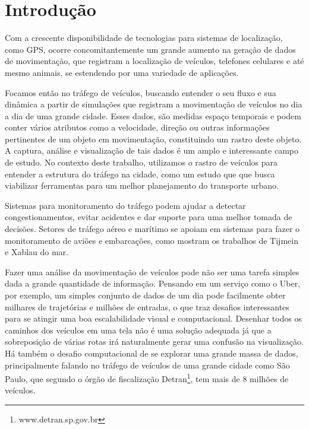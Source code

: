 \chapter{Introdução}
\label{cap:introducao}

Com a crescente disponibilidade de tecnologias para sistemas de localização,
como GPS, ocorre concomitantemente um grande aumento na geração de dados de
movimentação, que registram a localização de veículos, telefones celulares e
até mesmo animais, se estendendo por uma variedade de aplicações.

Focamos então no tráfego de veículos, buscando entender
o seu fluxo e sua dinâmica a partir de simulações que registram a movimentação
de veículos no dia a dia de uma grande cidade.  Esses dados, são medidas espaço
temporais e podem conter vários atributos como
a velocidade, direção ou outras informações pertinentes de um objeto em movimentação,
constituindo um rastro deste objeto. A captura, análise e visualização de tais
dados é um amplo e interessante campo de estudo. No contexto deste trabalho, utilizamos
o rastro de veículos para  entender a estrutura do tráfego na cidade, como um
estudo que que busca viabilizar ferramentas para um melhor planejamento do transporte urbano.

Sistemas para monitoramento do tráfego podem ajudar a detectar congestionamentos,
evitar acidentes e dar suporte para uma melhor tomada de decisões. Setores de tráfego
aéreo e marítimo se apoiam em sistemas para fazer o monitoramento de aviões
e embarcações, como mostram os trabalhos de Tijmein e Xablau do mar.

Fazer uma análise da movimentação de veículos pode não ser uma tarefa simples dada
a grande quantidade de informação. Pensando em um serviço como o Uber, por exemplo,
um simples conjunto de dados de um dia pode facilmente obter milhares de trajetórias e milhões
de entradas, o que traz desafios interessantes para se atingir uma boa escalabilidade
visual e computacional. Desenhar todos os caminhos dos veículos em uma tela  não é uma solução
adequada já que a sobreposição de várias rotas irá naturalmente gerar uma confusão na visualização.
Há também o desafio computacional de se explorar uma grande massa de dados, principalmente
falando no tráfego de veículos de uma grande cidade como São Paulo, 
que segundo o órgão de fiscalização
Detran\footnote{www.detran.sp.gov.br}, tem mais de 8 milhões de veículos.

